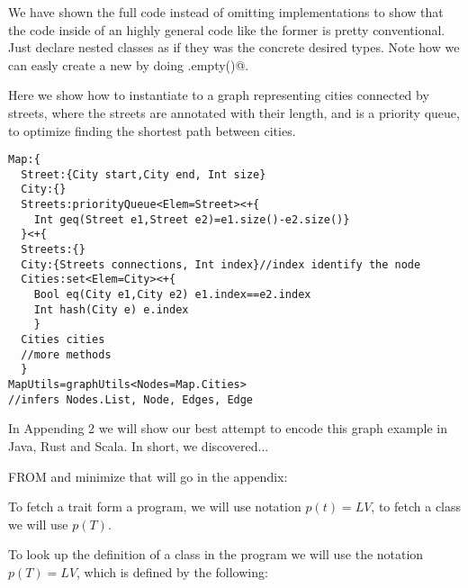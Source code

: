 We have shown the full code instead of omitting implementations to show that
the code inside of an highly general code like the former is pretty conventional.
Just declare nested classes as if they was the concrete desired types. Note how we can easly create a new \@Nodes@ by doing \Q@Nodes.empty()@.

Here we show how to instantiate \Q@graphUtils@ to a graph representing cities connected by streets,
where the streets are annotated with their length, and \Q@Edges@ is a priority queue, to optimize
finding the shortest path between cities.

\begin{lstlisting}
Map:{
  Street:{City start,City end, Int size}
  City:{}
  Streets:priorityQueue<Elem=Street><+{    
    Int geq(Street e1,Street e2)=e1.size()-e2.size()}
  }<+{
  Streets:{}
  City:{Streets connections, Int index}//index identify the node
  Cities:set<Elem=City><+{
    Bool eq(City e1,City e2) e1.index==e2.index
    Int hash(City e) e.index
    }
  Cities cities
  //more methods
  }
MapUtils=graphUtils<Nodes=Map.Cities>
//infers Nodes.List, Node, Edges, Edge
\end{lstlisting}

In Appending 2 we will show our best attempt to encode this graph example in Java, Rust and Scala.
In short, we discovered...




FROM and minimize that will go in the appendix:

To fetch a trait form a program, we will use notation $p(t)=LV$, to 
fetch a class we will use $p(T)$.

To look up the definition of a class in the program we will use the notation
$p(T)=\textit{LV}$, which is defined by the following:%
\noindent
\begin{defye}%
%
%
%
%
%
%
\end{defye}


